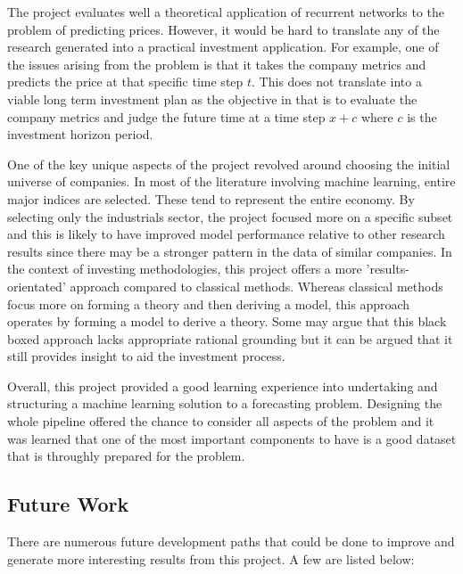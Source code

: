\documentclass[10pt,onecolumn,letterpaper]{article}
\begin{document}
The project evaluates well a theoretical application of recurrent networks to the problem of predicting prices. However, it would be hard to translate any of the research generated into a practical investment application. For example, one of the issues arising from the problem is that it takes the company metrics and predicts the price at that specific time step $t$. This does not translate into a viable long term investment plan as the objective in that is to evaluate the company metrics and judge the future time at a time step $x+c$ where $c$ is the investment horizon period.

One of the key unique aspects of the project revolved around choosing the initial universe of companies. In most of the literature involving machine learning, entire major indices are selected. These tend to represent the entire economy. By selecting only the industrials sector, the project focused more on a specific subset and this is likely to have improved model performance relative to other research results since there may be a stronger pattern in the data of similar companies. In the context of investing methodologies, this project offers a more 'results-orientated' approach compared to classical methods. Whereas classical methods focus more on forming a theory and then deriving a model, this approach operates by forming a model to derive a theory. Some may argue that this black boxed approach lacks appropriate rational grounding but it can be argued that it still provides insight to aid the investment process.

Overall, this project provided a good learning experience into undertaking and structuring a machine learning solution to a forecasting problem. Designing the whole pipeline offered the chance to consider all aspects of the problem and it was learned that one of the most important components to have is a good dataset that is throughly prepared for the problem.

\subsection{Future Work} 

There are numerous future development paths that could be done to improve and generate more interesting results from this project. A few are listed below:  
\end{document}
